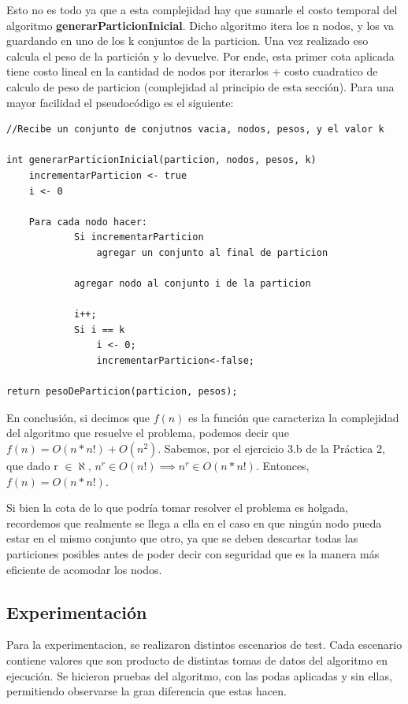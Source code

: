 \documentclass[10pt,a4paper]{article}
\begin{document}
Esto no es todo ya que a esta complejidad hay que sumarle el costo temporal del algoritmo \textbf{generarParticionInicial}. Dicho algoritmo itera los n nodos, y los va guardando en uno de los k conjuntos de la particion. Una vez realizado eso calcula el peso de la partición y lo devuelve.
Por ende, esta primer cota aplicada tiene costo lineal en la cantidad de nodos por iterarlos + costo cuadratico de calculo de peso de particion (complejidad al principio de esta sección). Para una mayor facilidad el pseudocódigo es el siguiente:

\begin{lstlisting}
//Recibe un conjunto de conjutnos vacia, nodos, pesos, y el valor k

int generarParticionInicial(particion, nodos, pesos, k)
	incrementarParticion <- true
	i <- 0
		
	Para cada nodo hacer:
			Si incrementarParticion
				agregar un conjunto al final de particion
		
			agregar nodo al conjunto i de la particion		
		
			i++;
			Si i == k
				i <- 0;
				incrementarParticion<-false;
			
return pesoDeParticion(particion, pesos);
\end{lstlisting}

En conclusión, si decimos que $f(n)$ es la función que caracteriza la complejidad del algoritmo que resuelve el problema, podemos decir que $f(n) = O(n*n!) + O(n^2)$. Sabemos, por el ejercicio 3.b de la Práctica 2, que dado r $\in \aleph$, $n^r \in O(n!) \implies n^r \in O(n*n!)$. Entonces, $f(n) = O(n*n!)$.

Si bien la cota de lo que podría tomar resolver el problema es holgada, recordemos que realmente se llega a ella en el caso en que ningún nodo pueda estar en el mismo conjunto que otro, ya que se deben descartar todas las particiones posibles antes de poder decir con seguridad que es la manera más eficiente de acomodar los nodos.

\subsection{Experimentación}
Para la experimentacion, se realizaron distintos escenarios de test. Cada escenario contiene valores que son producto de distintas tomas de datos del algoritmo en ejecución.
Se hicieron pruebas del algoritmo, con las podas aplicadas y sin ellas, permitiendo observarse la gran diferencia que estas hacen.
\end{document}
